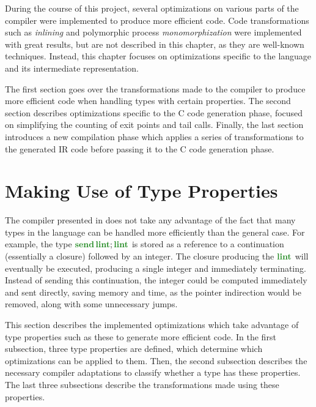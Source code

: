 \label{chap:optimizations}

During the course of this project, several optimizations on various parts of the compiler were implemented to produce more efficient code. Code transformations such as \textit{inlining} and polymorphic process \textit{monomorphization} were implemented with great results, but are not described in this chapter, as they are well-known techniques. Instead, this chapter focuses on optimizations specific to the language and its intermediate representation.

The first section goes over the transformations made to the compiler to produce more efficient code when handling types with certain properties. The second section describes optimizations specific to the C code generation phase, focused on simplifying the counting of exit points and tail calls. Finally, the last section introduces a new compilation phase which applies a series of transformations to the generated \ac{IR} code before passing it to the C code generation phase.

\section{Making Use of Type Properties}

The compiler presented in  does not take any advantage of the fact that many types in the language can be handled more efficiently than the general case. For example, the type $\sendt{\lintt}{\lintt}$ is stored as a reference to a continuation (essentially a closure) followed by an integer. The closure producing the $\lintt$ will eventually be executed, producing a single integer and immediately terminating. Instead of sending this continuation, the integer could be computed immediately and sent directly, saving memory and time, as the pointer indirection would be removed, along with some unnecessary jumps.

This section describes the implemented optimizations which take advantage of type properties such as these to generate more efficient code. In the first subsection, three type properties are defined, which determine which optimizations can be applied to them. Then, the second subsection describes the necessary compiler adaptations to classify whether a type has these properties. The last three subsections describe the transformations made using these properties.


